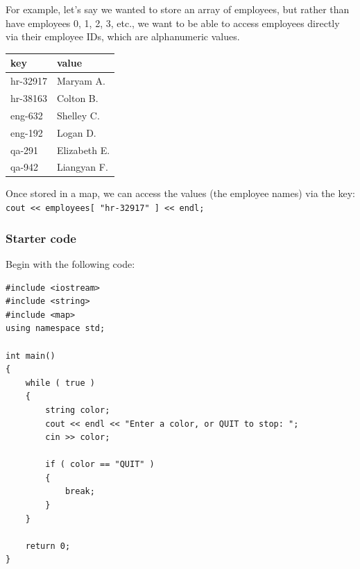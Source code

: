 \documentclass[a4paper,12pt]{book}
\begin{document}
                    For example, let's say we wanted to store an array of
                    employees, but rather than have employees 0, 1, 2, 3, etc.,
                    we want to be able to access employees directly via their
                    employee IDs, which are alphanumeric values. \\

                    \begin{center}
                        \begin{tabular}{ | l | l | }
                            \hline
                            \textbf{ key } & \textbf{ value }  \\ \hline
                                hr-32917 & Maryam A. \\ \hline
                                hr-38163 & Colton B. \\ \hline
                                eng-632 & Shelley C. \\ \hline
                                eng-192 & Logan D. \\ \hline
                                qa-291 & Elizabeth E. \\ \hline
                                qa-942 & Liangyan F. \\ \hline
                        \end{tabular}
                    \end{center}

                    Once stored in a map, we can access the values (the
                    employee names) via the key:
                    \texttt{ cout << employees[ "hr-32917" ] << endl; }
                    


                \hrulefill{}
                \subsubsection*{ Starter code }
                    Begin with the following code:

\begin{lstlisting}[style=code]
#include <iostream>
#include <string>
#include <map>
using namespace std;

int main()
{
    while ( true )
    {
        string color;
        cout << endl << "Enter a color, or QUIT to stop: ";
        cin >> color;
        
        if ( color == "QUIT" )
        {
            break;
        }
    }
    
    return 0;
}
\end{lstlisting}
\end{document}
